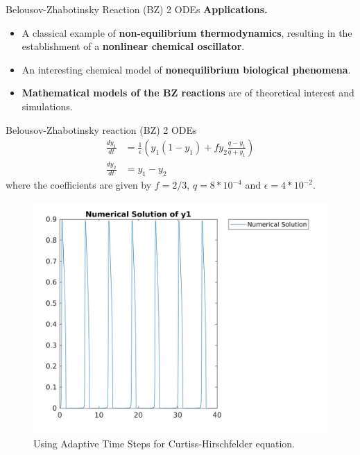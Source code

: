 \documentclass[9pt]{beamer}
\numberwithin{equation}{section}
\begin{document}
\begin{frame}{Belousov-Zhabotinsky Reaction (BZ) 2 ODEs}
\textbf{\textsf{Applications.}}
\begin{itemize}
\item A classical example of \textbf{non-equilibrium thermodynamics}, resulting in the establishment of a \textbf{nonlinear chemical oscillator}.
\item An interesting chemical model of \textbf{nonequilibrium biological phenomena}.
\item \textbf{Mathematical models of the BZ reactions} are of theoretical interest and simulations.
\end{itemize}
\begin{block}{Belousov-Zhabotinsky reaction (BZ) 2 ODEs}
\begin{subequations}
\begin{align}
    \frac{dy_1}{dt}  &=  \frac{1}{\epsilon} \left( y_1(1-y_1) + fy_2\frac{q-y_1}{q+y_1} \right)
    \\
    \frac{dy_2}{dt}  &=  y_1-y_2
\end{align}
\end{subequations}
where the coefficients are given by $f = 2/3$, $q = 8*10^{-4}$ and $\epsilon = 4*10^{-2}$.
%
\end{block}
\end{frame}

\begin{frame}
\begin{figure}
\centering
\includegraphics[scale=0.15]{ats_o2_y1}
\caption{Using Adaptive Time Steps for Curtiss-Hirschfelder equation.}
\end{figure}
\end{frame}
\end{document}
